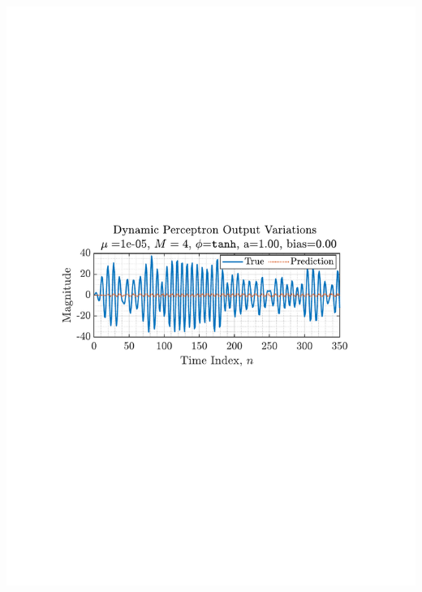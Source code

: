\documentclass[12pt]{article}
\numberwithin{equation}{section}
\begin{document}
		\begin{minipage}[b]{0.49\textwidth}
			\centering
			\includegraphics[trim={2.2cm 11.2cm 3.15cm  11.2cm}, clip, width=\textwidth]{../MATLAB/figures/q4_2_fig01.pdf} 
			\captionsetup{justification=centering}
			\label{fig: 4-2}
		\end{minipage}%
	
	
\end{document}
